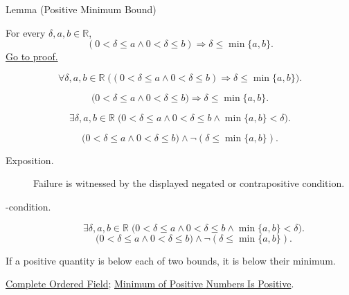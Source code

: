 \begin{lemmabox}{Lemma (Positive Minimum Bound)}
\begin{lemma}
\label{lem:positive-minimum-bound}
For every $\delta,a,b\in\mathbb{R}$,
\[
  (0<\delta\leq a\land 0<\delta\leq b)
  \Longrightarrow
  \delta\leq \min\{a,b\}.
\]
\hyperref[prf:positive-minimum-bound]{Go to proof.}
\end{lemma}
\end{lemmabox}
\begin{remark*}
\[
\forall \delta,a,b\in\mathbb{R}\;
\bigl((0<\delta\leq a\land 0<\delta\leq b)\Longrightarrow
\delta\leq \min\{a,b\}\bigr).
\]
\end{remark*}
\begin{remark*}
\[
\bigl(0<\delta\leq a\land 0<\delta\leq b\bigr)
\Longrightarrow \delta\leq\min\{a,b\}.
\]
\end{remark*}
\begin{remark*}
\[
\exists \delta,a,b\in\mathbb{R}\;
\bigl(0<\delta\leq a\land 0<\delta\leq b\land \min\{a,b\}<\delta\bigr).
\]
\end{remark*}
\begin{remark*}
\[
\bigl(0<\delta\leq a\land 0<\delta\leq b\bigr)\land
\neg(\delta\leq\min\{a,b\}).
\]
\end{remark*}

\begin{remark*}
\begin{description}
  \item[Exposition.]
  Failure is witnessed by the displayed negated or contrapositive condition.

  \item[\exists-condition.]
  \[
\exists \delta,a,b\in\mathbb{R}\;
\bigl(0<\delta\leq a\land 0<\delta\leq b\land \min\{a,b\}<\delta\bigr).
\]
\[
\bigl(0<\delta\leq a\land 0<\delta\leq b\bigr)\land
\neg(\delta\leq\min\{a,b\}).
\]
\end{description}
\end{remark*}
\begin{remark*}[Interpretation]
If a positive quantity is below each of two bounds, it is below their minimum.
\end{remark*}
\begin{dependencies}
\hyperref[def:real-ordered-field]{Complete Ordered Field};
\hyperref[lem:minimum-of-positive-numbers-is-positive]{Minimum of Positive Numbers Is Positive}.
\end{dependencies}
